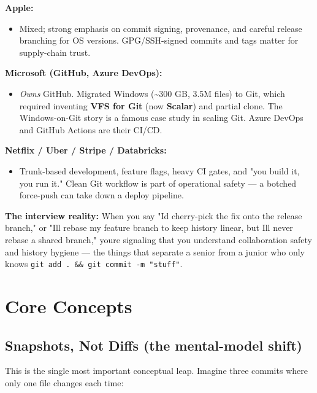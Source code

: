 \documentclass[11pt]{article}
\providecommand{\tightlist}{\setlength{\itemsep}{1pt}\setlength{\parskip}{0pt}}
\begin{document}
\textbf{Apple:}

\begin{itemize}
\tightlist
\item
  Mixed; strong emphasis on commit signing, provenance, and careful release branching for OS versions. GPG/SSH-signed commits and tags matter for supply-chain trust.
\end{itemize}

\textbf{Microsoft (GitHub, Azure DevOps):}

\begin{itemize}
\tightlist
\item
  \emph{Owns} GitHub. Migrated Windows (\textasciitilde300 GB, 3.5M files) to Git, which required inventing \textbf{VFS for Git} (now \textbf{Scalar}) and partial clone. The Windows-on-Git story is a famous case study in scaling Git. Azure DevOps and GitHub Actions are their CI/CD.
\end{itemize}

\textbf{Netflix / Uber / Stripe / Databricks:}

\begin{itemize}
\tightlist
\item
  Trunk-based development, feature flags, heavy CI gates, and "you build it, you run it." Clean Git workflow is part of operational safety --- a botched force-push can take down a deploy pipeline.
\end{itemize}

\textbf{The interview reality:} When you say "I\textquotesingle d cherry-pick the fix onto the release branch," or "I\textquotesingle ll rebase my feature branch to keep history linear, but I\textquotesingle ll never rebase a shared branch," you\textquotesingle re signaling that you understand collaboration safety and history hygiene --- the things that separate a senior from a junior who only knows \texttt{git\ add\ .\ \&\&\ git\ commit\ -m\ "stuff"}.

\section{Core Concepts}\label{core-concepts}

\subsection{Snapshots, Not Diffs (the mental-model shift)}\label{snapshots-not-diffs-the-mental-model-shift}

This is the single most important conceptual leap. Imagine three commits where only one file changes each time:
\end{document}
